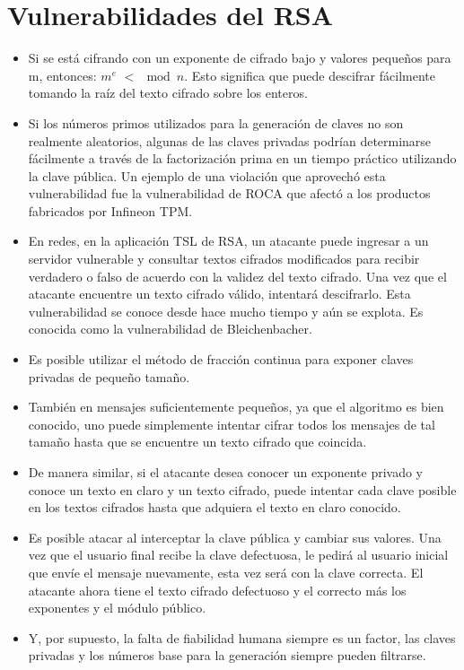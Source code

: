 \documentclass[12pt, a4paper]{article}
\begin{document}
	\section{Vulnerabilidades del RSA}

	\begin{itemize}
		\item Si se está cifrando con un exponente de cifrado bajo y valores pequeños para m, entonces: $m^{e}$ $<\mod{n}$. Esto significa que puede descifrar fácilmente tomando la raíz del texto cifrado sobre los enteros.
		\item Si los números primos utilizados para la generación de claves no son realmente aleatorios, algunas de las claves privadas podrían determinarse fácilmente a través de la factorización prima en un tiempo práctico utilizando la clave pública. Un ejemplo de una violación que aprovechó esta vulnerabilidad fue la vulnerabilidad de ROCA que afectó a los productos fabricados por Infineon TPM.
		\item En redes, en la aplicación TSL de RSA, un atacante puede ingresar a un servidor vulnerable y consultar textos cifrados modificados para recibir verdadero o falso de acuerdo con la validez del texto cifrado. Una vez que el atacante encuentre un texto cifrado válido, intentará descifrarlo. Esta vulnerabilidad se conoce desde hace mucho tiempo y aún se explota. Es conocida como la vulnerabilidad de Bleichenbacher.
		\item Es posible utilizar el método de fracción continua para exponer claves privadas de pequeño tamaño.
		\item También en mensajes suficientemente pequeños, ya que el algoritmo es bien conocido, uno puede simplemente intentar cifrar todos los mensajes de tal tamaño hasta que se encuentre un texto cifrado que coincida.
		\item De manera similar, si el atacante desea conocer un exponente privado y conoce un texto en claro y un texto cifrado, puede intentar cada clave posible en los textos cifrados hasta que adquiera el texto en claro conocido.
		\item Es posible atacar al interceptar la clave pública y cambiar sus valores. Una vez que el usuario final recibe la clave defectuosa, le pedirá al usuario inicial que envíe el mensaje nuevamente, esta vez será con la clave correcta. El atacante ahora tiene el texto cifrado defectuoso y el correcto más los exponentes y el módulo público.
		\item Y, por supuesto, la falta de fiabilidad humana siempre es un factor, las claves privadas y los números base para la generación siempre pueden filtrarse.
	\end{itemize}
\end{document}
